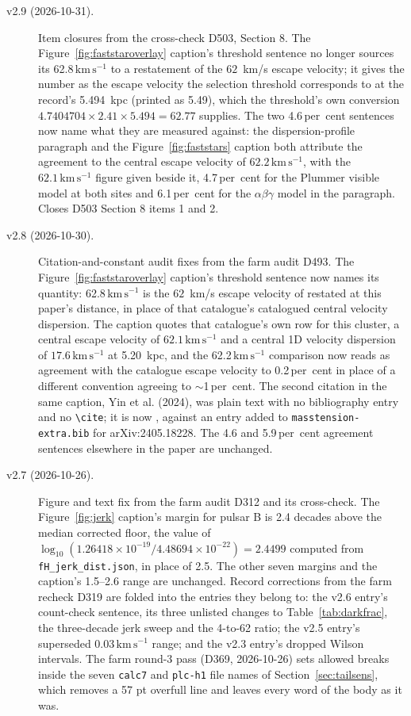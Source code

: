 \documentclass[11pt]{article}
\newcommand{\kms}{\ensuremath{\mathrm{km\,s^{-1}}}}
\begin{document}
\begin{description}
\item[v2.9 (2026-10-31).] Item closures from the cross-check D503, Section 8. The Figure~\ref{fig:faststaroverlay} caption's threshold sentence no longer sources its 62.8\,\kms{} to a restatement of the $62$~km/s escape velocity; it gives the number as the escape velocity the selection threshold corresponds to at the record's 5.494~kpc (printed as 5.49), which the threshold's own conversion $4.7404704 \times 2.41 \times 5.494 = 62.77$ supplies. The two 4.6\,per~cent sentences now name what they are measured against: the dispersion-profile paragraph and the Figure~\ref{fig:faststars} caption both attribute the agreement to the \citet{Yin2024} central escape velocity of $62.2\,\kms$, with the \citet{BaumgardtHilker2018} $62.1\,\kms$ figure given beside it, 4.7\,per~cent for the Plummer visible model at both sites and 6.1\,per~cent for the $\alpha\beta\gamma$ model in the paragraph. Closes D503 Section 8 items 1 and 2.
\item[v2.8 (2026-10-30).] Citation-and-constant audit fixes from the farm audit D493. The Figure~\ref{fig:faststaroverlay} caption's threshold sentence now names its quantity: 62.8\,\kms{} is the $62$~km/s escape velocity of \citet{BaumgardtHilker2018} restated at this paper's distance, in place of that catalogue's catalogued central velocity dispersion. The caption quotes that catalogue's own row for this cluster, a central escape velocity of $62.1\,\kms$ and a central 1D velocity dispersion of $17.6\,\kms$ at 5.20~kpc, and the 62.2\,\kms{} comparison now reads as agreement with the catalogue escape velocity to 0.2\,per~cent in place of a different convention agreeing to $\sim$1\,per~cent. The second citation in the same caption, Yin et al. (2024), was plain text with no bibliography entry and no \verb|\cite|; it is now \citet{Yin2024}, against an entry added to \texttt{masstension-extra.bib} for arXiv:2405.18228. The 4.6 and 5.9\,per~cent agreement sentences elsewhere in the paper are unchanged.
\item[v2.7 (2026-10-26).] Figure and text fix from the farm audit D312 and its cross-check. The Figure~\ref{fig:jerk} caption's margin for pulsar B is 2.4 decades above the median corrected floor, the value of $\log_{10}(1.26418\times10^{-19}/4.48694\times10^{-22}) = 2.4499$ computed from \texttt{fH\_jerk\_dist.json}, in place of 2.5. The other seven margins and the caption's 1.5--2.6 range are unchanged. Record corrections from the farm recheck D319 are folded into the entries they belong to: the v2.6 entry's count-check sentence, its three unlisted changes to Table~\ref{tab:darkfrac}, the three-decade jerk sweep and the 4-to-62 ratio; the v2.5 entry's superseded 0.03\,\kms{} range; and the v2.3 entry's dropped Wilson intervals. The farm round-3 pass (D369, 2026-10-26) sets allowed breaks inside the seven \texttt{calc7} and \texttt{plc-h1} file names of Section~\ref{sec:tailsens}, which removes a 57 pt overfull line and leaves every word of the body as it was.

\end{description}
\end{document}
